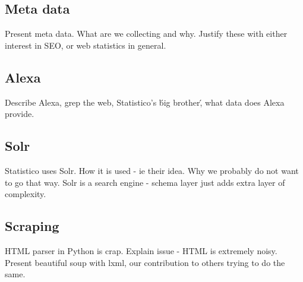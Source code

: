 \subsection{Meta data}
\label{subsec:meta_data}
Present meta data. What are we collecting and why. Justify these with either interest in SEO, or web statistics in general.

\subsection{Alexa}
\label{subsec:alexa}
Describe Alexa, grep the web, Statistico's \'big brother\', what data does Alexa provide.

\subsection{Solr}
\label{subsec:solr}
Statistico uses Solr. How it is used - ie their idea. Why we probably do not want to go that way. Solr is a search engine - schema layer just adds extra layer of complexity.

\subsection{Scraping}
\label{subsec:scraping}
HTML parser in Python is crap. Explain issue - HTML is extremely noisy. Present beautiful soup with lxml, our contribution to others trying to do the same.




